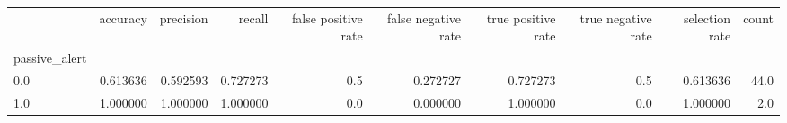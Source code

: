 \begin{tabular}{lrrrrrrrrr}
\toprule
{} &  accuracy &  precision &    recall &  false positive rate &  false negative rate &  true positive rate &  true negative rate &  selection rate &  count \\
passive\_alert &           &            &           &                      &                      &                     &                     &                 &        \\
\midrule
0.0           &  0.613636 &   0.592593 &  0.727273 &                  0.5 &             0.272727 &            0.727273 &                 0.5 &        0.613636 &   44.0 \\
1.0           &  1.000000 &   1.000000 &  1.000000 &                  0.0 &             0.000000 &            1.000000 &                 0.0 &        1.000000 &    2.0 \\
\bottomrule
\end{tabular}
